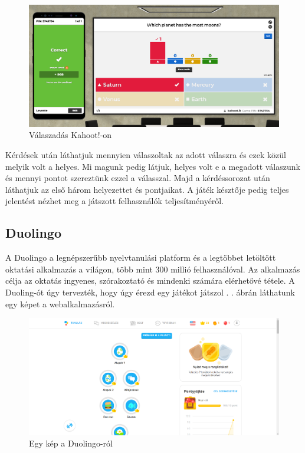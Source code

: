 \begin{figure}[h]
  \centering
  \includegraphics[width=\textwidth]{images/kahoot_play2.png}
  \caption{Válaszadás Kahoot!-on}
\end{figure}

Kérdések után láthatjuk mennyien válaszoltak az adott válaszra és ezek közül melyik volt a helyes. Mi magunk pedig látjuk, helyes volt e a megadott válaszunk és mennyi pontot szereztünk ezzel a válasszal. Majd a kérdéssorozat után láthatjuk az első három helyezettet és pontjaikat. A játék késztője pedig teljes jelentést nézhet meg a játszott felhasználók teljesítményéről.

\subsection{Duolingo}

A Duolingo a legnépszerűbb nyelvtanulási platform és a legtöbbet letöltött oktatási alkalmazás a világon, több mint 300 millió felhasználóval. Az alkalmazás célja az oktatás ingyenes, szórakoztató és mindenki számára elérhetővé tétele. A Duoling-ót úgy tervezték, hogy úgy érezd egy játékot játszol \cite{whatIsDuolingo}.
. ábrán láthatunk egy képet a webalkalmazásról.

\begin{figure}[h]
  \centering
  \includegraphics[width=\textwidth]{images/Duolingo_main_page.png}
  \caption{Egy kép a Duolingo-ról}
  \label{fig:duolingo}
\end{figure}

